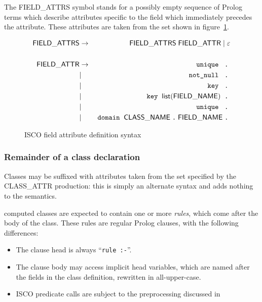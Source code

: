 The \textsf{FIELD\_ATTRS} symbol stands for a possibly empty sequence of
Prolog terms which describe attributes specific to the field which immediately
precedes the attribute.  These attributes are taken from the set shown in
figure~\ref{fig:syntax:field-attr}.
\begin{figure}[htb]
  \centering
  \begin{eqnarray*}
    \mathsf{FIELD\_ATTRS} & \rightarrow & \mathsf{FIELD\_ATTRS} \;
    \mathsf{FIELD\_ATTR} \;|\; \varepsilon \\
    \\
    \mathsf{FIELD\_ATTR} & \rightarrow & \;\texttt{unique}\; \; \;\texttt{.}\; \\
     & | & \;\texttt{not\_null}\; \; \;\texttt{.}\; \\
     & | & \;\texttt{key}\; \; \;\texttt{.}\; \\
     & | & \;\texttt{key}\; \; \mathsf{list}(\mathsf{FIELD\_NAME}) \; \;\texttt{.}\; \\
     & | & \;\texttt{unique}\; \; \;\texttt{.}\; \\
     & | & \;\texttt{domain}\; \; \mathsf{CLASS\_NAME} \;\texttt{.}\;
    \mathsf{FIELD\_NAME} \;\texttt{.}\;
  \end{eqnarray*}
  \caption{ISCO field attribute definition syntax}
  \label{fig:syntax:field-attr}
\end{figure}

\subsubsection{Remainder of a class declaration}
\label{sec:rema-class-decl}

Classes may be suffixed with attributes taken from the set specified by the
\textsf{CLASS\_ATTR} production: this is simply an alternate syntax and adds
nothing to the semantics.

\textsf{computed} classes are expected to contain one or more \emph{rules},
which come after the body of the class.  These rules are regular Prolog
clauses, with the following differences:
\begin{itemize}
\item The clause head is always ``\texttt{rule :-}''.
\item The clause body may access implicit head variables, which are named
  after the fields in the class definition, rewritten in all-upper-case.
\item ISCO predicate calls are subject to the preprocessing discussed in~\TBD
\end{itemize}


